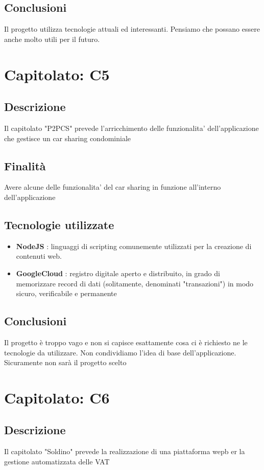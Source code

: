 \documentclass{article}
\begin{document}
        \subsection{Conclusioni}
            Il progetto utilizza tecnologie attuali ed interessanti. Pensiamo che possano essere anche molto utili per il futuro.
			
\newpage
    \section{Capitolato: C5}
        \subsection{Descrizione}
            Il capitolato "P2PCS" prevede l'arricchimento delle funzionalita' dell'applicazione che gestisce un car sharing condominiale
        \subsection{Finalità}
            Avere alcune delle funzionalita' del car sharing in funzione all'interno dell'applicazione
        \subsection{Tecnologie utilizzate}
    \begin{itemize}
	   \item \textbf{NodeJS} : linguaggi di scripting comunemente utilizzati per la creazione di contenuti web.
	   \item \textbf{GoogleCloud} : registro digitale aperto e distribuito, in grado di memorizzare record di dati (solitamente, denominati "transazioni") in modo sicuro, verificabile e permanente
     \end{itemize}
        \subsection{Conclusioni}
            Il progetto è troppo vago e non si capisce esattamente cosa ci è richiesto ne le tecnologie da utilizzare.
            Non condividiamo l'idea di base dell'applicazione. Sicuramente non sarà il progetto scelto
\newpage

\newpage
    \section{Capitolato: C6}
        \subsection{Descrizione}
            Il capitolato "Soldino" prevede la realizzazione di una piattaforma wepb er la gestione automatizzata delle VAT
\end{document}

